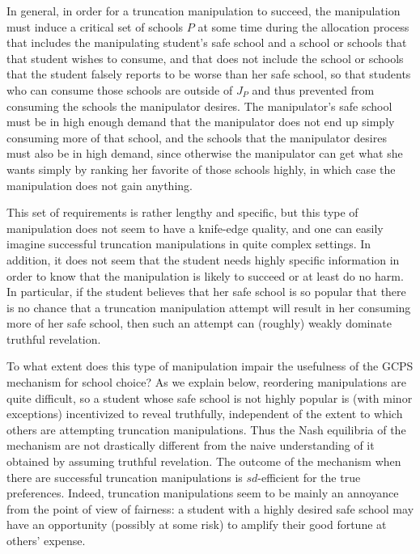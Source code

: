 \documentclass[12pt]{article}
\theoremstyle{definition}
\begin{document}
In general, in order for a truncation manipulation to succeed, the manipulation must induce a critical set of schools $P$ at some time during the allocation process that includes the manipulating student's safe school and a school or schools that that student wishes to consume, and that does not include the school or schools that the student falsely reports to be worse than her safe school, so that students who can consume those schools are outside of $J_P$ and thus prevented from consuming the schools the manipulator desires.  The manipulator's safe school must be in high enough demand that the manipulator does not end up simply consuming more of that school, and the schools that the manipulator desires must also be in high demand, since otherwise the manipulator can get what she wants simply by ranking her favorite of those schools highly, in which case the manipulation does not gain anything.  

This set of requirements is rather lengthy and specific, but this type of manipulation does not seem to have a knife-edge quality, and one can easily imagine successful truncation manipulations in quite complex settings.  In addition, it does not seem that the student needs highly specific information in order to know that the manipulation is likely to succeed or at least do no harm.  In particular, if the student believes that her safe school is so popular that there is no chance that a truncation manipulation attempt will result in her consuming more of her safe school, then such an attempt can (roughly) weakly dominate truthful revelation.

To what extent does this type of manipulation impair the usefulness of the GCPS mechanism for school choice?  As we explain below, reordering manipulations are quite difficult, so a student whose safe school is not highly popular is (with minor exceptions) incentivized to reveal truthfully, independent of the extent to which others are attempting truncation manipulations.  Thus the Nash equilibria of the mechanism are not drastically different from the naive understanding of it obtained by assuming truthful revelation.  The outcome of the mechanism when there are successful truncation manipulations is $sd$-efficient for the true preferences.  Indeed, truncation manipulations seem to be mainly an annoyance from the point of view of fairness: a student with a highly desired safe school may have an opportunity (possibly at some risk) to amplify their good fortune at others' expense.
\end{document}
